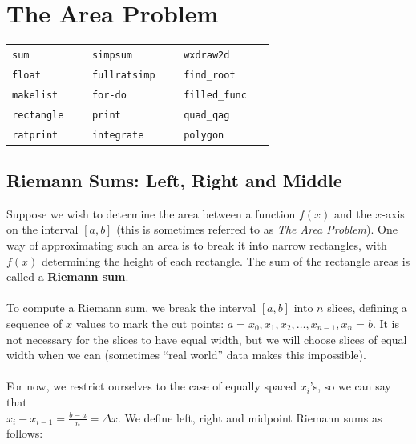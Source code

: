 \documentclass[10.5pt,twoside]{report}
\theoremstyle{definition}
\begin{document}
\chapter{The Area Problem}

\vspace*{\fill}

\minitoc

\vspace*{\fill}




\newline
\newline

\begin{tabular}{l l l}
 \verb|sum   |   &\verb|simpsum   |   &\verb|wxdraw2d   |   \\
 \verb|float   |   &\verb|fullratsimp   |   &\verb|find_root   |   \\
 \verb|makelist   |   &\verb|for-do   |   &\verb|filled_func   |   \\
 \verb|rectangle   |   &\verb|print   |   &\verb|quad_qag   |   \\
 \verb|ratprint   |   &\verb|integrate   |   &\verb|polygon   |   \\
\end{tabular}

\pagebreak



\section{Riemann Sums:  Left, Right and Middle}\label{Riemann Sums:  Left, Right and Middle}

Suppose we wish to determine the area between a function $f(x)$ and the $x$-axis on the interval ${[a,b]}$ (this is sometimes referred to as \textit{The Area Problem}).  One way of approximating such an area is to break it into narrow rectangles, with $f(x)$ determining the height of each rectangle.  The sum of the rectangle areas is called a \textbf{Riemann sum}.  \\
${}$\\
To compute a Riemann sum, we break the interval ${[a,b]}$ into $n$ slices, defining a sequence of $x$ values to mark the cut points:  $a=x_0, x_1, x_2,\dots , x_{n-1},x_n=b$.  It is not necessary for the slices to have equal width, but we will choose slices of equal width when we can (sometimes ``real world'' data makes this impossible).\\
${}$\\
For now, we restrict ourselves to the case of equally spaced $x_i$'s, so we can say that\\ $x_i-x_{i-1}=\frac {b-a}{n}=\Delta x$.  We define left, right and midpoint Riemann sums as follows:\\
\end{document}
